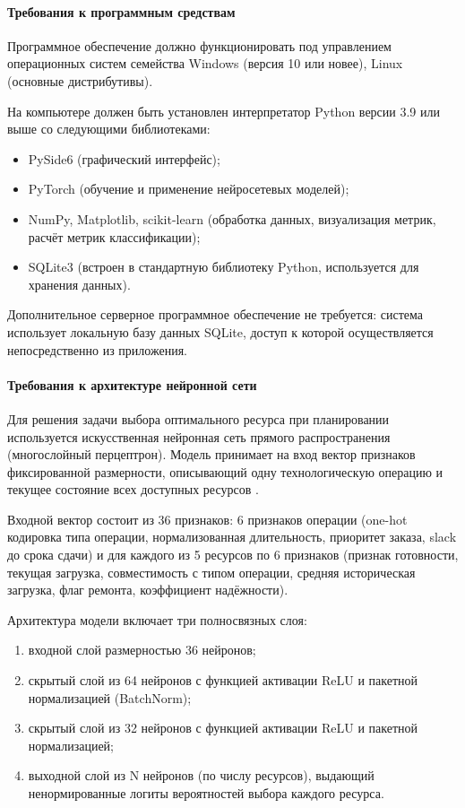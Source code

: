 \paragraph{Требования к программным средствам}

Программное обеспечение должно функционировать под управлением операционных систем семейства Windows (версия 10 или новее), Linux (основные дистрибутивы).

На компьютере должен быть установлен интерпретатор Python версии 3.9 или выше со следующими библиотеками:

\begin{itemize}
\item PySide6 (графический интерфейс);
\item PyTorch (обучение и применение нейросетевых моделей);
\item NumPy, Matplotlib, scikit-learn (обработка данных, визуализация метрик, расчёт метрик классификации);
\item SQLite3 (встроен в стандартную библиотеку Python, используется для хранения данных).
\end{itemize}

Дополнительное серверное программное обеспечение не требуется: система использует локальную базу данных SQLite, доступ к которой осуществляется непосредственно из приложения.

\paragraph{Требования к архитектуре нейронной сети}

Для решения задачи выбора оптимального ресурса при планировании используется искусственная нейронная сеть прямого распространения (многослойный перцептрон). Модель принимает на вход вектор признаков фиксированной размерности, описывающий одну технологическую операцию и текущее состояние всех доступных ресурсов \cite{keras}.

Входной вектор состоит из 36 признаков: 6 признаков операции (one-hot кодировка типа операции, нормализованная длительность, приоритет заказа, slack до срока сдачи) и для каждого из 5 ресурсов по 6 признаков (признак готовности, текущая загрузка, совместимость с типом операции, средняя историческая загрузка, флаг ремонта, коэффициент надёжности).

Архитектура модели включает три полносвязных слоя:
\begin{enumerate}
\item входной слой размерностью 36 нейронов;
\item скрытый слой из 64 нейронов с функцией активации ReLU и пакетной нормализацией (BatchNorm);
\item скрытый слой из 32 нейронов с функцией активации ReLU и пакетной нормализацией;
\item выходной слой из N нейронов (по числу ресурсов), выдающий ненормированные логиты вероятностей выбора каждого ресурса.
\end{enumerate}


